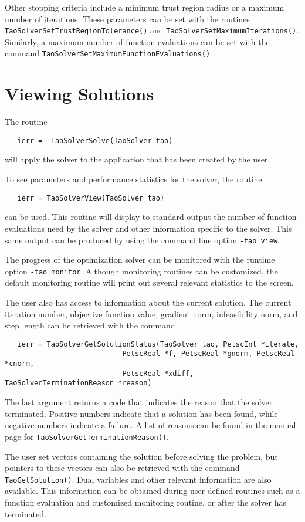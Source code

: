 Other stopping criteria include a minimum trust region radius or 
a maximum number of iterations.  These parameters can be set with
the routines {\tt TaoSolverSetTrustRegionTolerance()}
and {\tt TaoSolverSetMaximumIterations()}.
Similarly, a maximum number of function evaluations can be set 
with the command 
{\tt TaoSolverSetMaximumFunctionEvaluations()}
.

\section{Viewing Solutions}

The routine
\begin{verbatim}
   ierr =  TaoSolverSolve(TaoSolver tao)
\end{verbatim}
\noindent
will apply the solver to the application that has been created by the user.

To see parameters and performance statistics for the solver, the
routine
\begin{verbatim}
   ierr = TaoSolverView(TaoSolver tao)
\end{verbatim}
can be used.  This routine will display to standard output the number
of function evaluations need by the solver and other information
specific to the solver.  This same output can be produced by using the 
command line option {\tt -tao\_view}.

The progress of the optimization solver can be monitored with
the runtime option {\tt -tao\_monitor}.  Although monitoring routines
can be customized, the default monitoring routine will print out 
several relevant statistics to the screen.

The user also has access to information about the current solution.
The current iteration number, objective function value, gradient
norm, infeasibility norm, and step length 
can be retrieved with the command 
\begin{verbatim}
   ierr = TaoSolverGetSolutionStatus(TaoSolver tao, PetscInt *iterate, 
                            PetscReal *f, PetscReal *gnorm, PetscReal *cnorm,
                            PetscReal *xdiff, TaoSolverTerminationReason *reason)
\end{verbatim}
\noindent
The last argument returns
a code that indicates the reason that the solver terminated.  Positive 
numbers indicate that a solution has been found, while negative numbers
indicate a failure.  A list of reasons can be found in the manual page
for {\tt TaoSolverGetTerminationReason()}.

The user set
vectors containing the solution before solving
the problem, but pointers to these vectors can also be retrieved with the
command {\tt TaoGetSolution()}.
Dual variables and other relevant information are also available. 
This information can be obtained during
user-defined routines such as a function evaluation and customized
monitoring routine, or after the solver has terminated.

